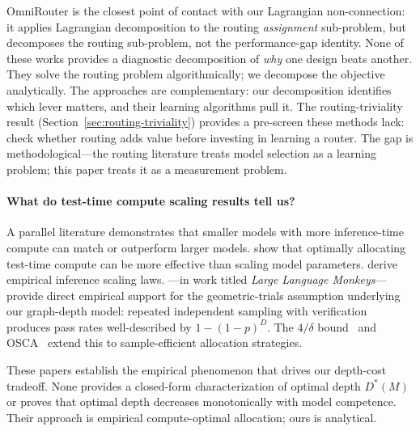 \documentclass[twoside,11pt]{article}
\newcommand{\Dstar}{D^*}
\begin{document}
OmniRouter is the closest point of contact with our Lagrangian non-connection: it applies Lagrangian decomposition to the routing \emph{assignment} sub-problem, but decomposes the routing sub-problem, not the performance-gap identity.
None of these works provides a diagnostic decomposition of \emph{why} one design beats another.
They solve the routing problem algorithmically; we decompose the objective analytically.
The approaches are complementary: our decomposition identifies which lever matters, and their learning algorithms pull it.
The routing-triviality result (Section~\ref{sec:routing-triviality}) provides a pre-screen these methods lack: check whether routing adds value before investing in learning a router.
The gap is methodological---the routing literature treats model selection as a learning problem; this paper treats it as a measurement problem.

\paragraph{What do test-time compute scaling results tell us?}
A parallel literature demonstrates that smaller models with more inference-time compute can match or outperform larger models.
\citet{snell2025testtime} show that optimally allocating test-time compute can be more effective than scaling model parameters.
\citet{wu2025inference} derive empirical inference scaling laws.
\citet{brown2024monkeys}---in work titled \emph{Large Language Monkeys}---provide direct empirical support for the geometric-trials assumption underlying our graph-depth model: repeated independent sampling with verification produces pass rates well-described by $1-(1-p)^D$.
The $4/\delta$ bound~\citep{fourdelta2024} and OSCA~\citep{osca2024} extend this to sample-efficient allocation strategies.

These papers establish the empirical phenomenon that drives our depth-cost tradeoff.
None provides a closed-form characterization of optimal depth $\Dstar(M)$ or proves that optimal depth decreases monotonically with model competence.
Their approach is empirical compute-optimal allocation; ours is analytical.
\end{document}
